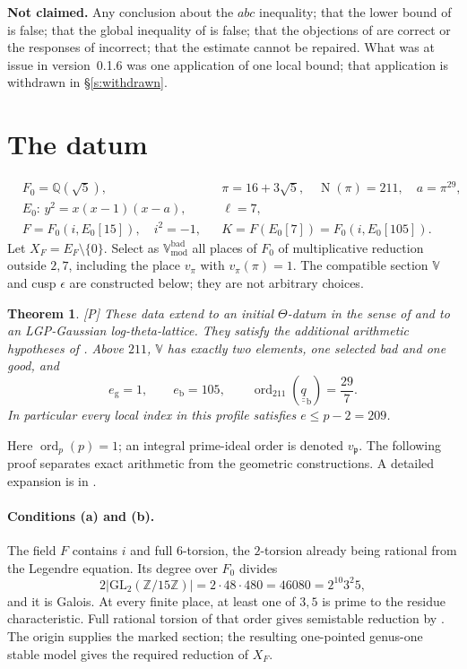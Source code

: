 \documentclass[11pt]{article}
\theoremstyle{plain}
\newtheorem{theorem}{Theorem}
\theoremstyle{definition}
\newcommand{\Vbad}{\mathbb{V}^{\mathrm{bad}}}
\newcommand{\VV}{\mathbb{V}}
\newcommand{\ord}{\operatorname{ord}}
\newcommand{\Norm}{\operatorname{N}}
\begin{document}
\smallskip\noindent\textbf{Not claimed.}  Any conclusion about the $abc$ inequality;
that the lower bound of \cite[Cor.~3.12]{IUT3} is false; that the global
inequality of \cite[Thm.~1.10]{IUT4} is false; that the objections of \cite{SS}
are correct or the responses of \cite{Rpt} incorrect; that the estimate cannot be
repaired.  What was at issue in version~0.1.6 was one application of one local
bound; that application is withdrawn in \S\ref{s:withdrawn}.

\section{The datum}\label{s:datum}

\begin{equation}\label{e:datum}
\begin{aligned}
 &F_0=\mathbb{Q}(\sqrt5), &&\pi=16+3\sqrt5,\quad \Norm(\pi)=211,\quad a=\pi^{29},\\
 &E_0:\,y^2=x(x-1)(x-a), &&\ell=7,\\
 &F=F_0(i,E_0[15]),\quad i^2=-1, &&K=F(E_0[7])=F_0(i,E_0[105]).
\end{aligned}
\end{equation}
Let $X_F=E_F\setminus\{0\}$.  Select as $\Vbad_{\mathrm{mod}}$ all places
of $F_0$ of multiplicative reduction outside $2,7$, including the place
$v_\pi$ with $v_\pi(\pi)=1$.  The compatible section $\VV$ and cusp
$\epsilon$ are constructed below; they are not arbitrary choices.

\begin{theorem}\label{t:datum}
\textup{[P]} These data extend to an initial $\Theta$-datum in the sense of
\cite[Def.~3.1]{IUT1} and to an LGP-Gaussian log-theta-lattice.  They satisfy
the additional arithmetic hypotheses of \cite[Thm.~1.10]{IUT4}.
Above $211$, $\VV$ has exactly two elements, one selected bad and one good, and
\[
 e_{\mathrm g}=1,\qquad e_{\mathrm b}=105,\qquad
 \ord_{211}(\underline{\underline q}_{\mathrm b})=\frac{29}{7}.
\]
In particular every local index in this profile satisfies $e\le p-2=209$.
\end{theorem}

Here $\ord_p(p)=1$; an integral prime-ideal order is denoted $v_\mathfrak p$.
The following proof separates exact arithmetic from the geometric constructions.
A detailed expansion is in \cite[\S\S3--5, especially \S4.6]{Firstfull}.

\paragraph{Conditions (a) and (b).}
The field $F$ contains $i$ and full $6$-torsion, the $2$-torsion already
being rational from the Legendre equation.  Its degree over $F_0$ divides
\[
 2|\mathrm{GL}_2(\mathbb Z/15\mathbb Z)|
 =2\cdot48\cdot480=46080=2^{10}3^2 5,
\]
and it is Galois.  At every finite place, at least one of $3,5$ is prime
to the residue characteristic.  Full rational torsion of that order gives
semistable reduction by \cite[Prop.~1.8(v)]{IUT4}.  The origin supplies the
marked section; the resulting one-pointed genus-one stable model gives the
required reduction of $X_F$.
\end{document}
